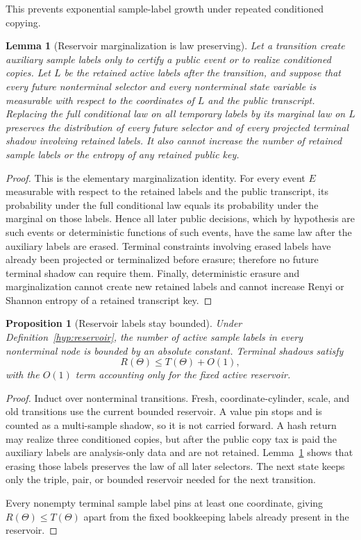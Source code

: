 \documentclass[11pt]{article}
\newtheorem{lemma}[theorem]{Lemma}
\newtheorem{proposition}[theorem]{Proposition}
\begin{document}
This prevents exponential sample-label growth under repeated conditioned
copying.

\begin{lemma}[Reservoir marginalization is law preserving]
\label{lem:reservoir-marginalization}
Let a transition create auxiliary sample labels only to certify a public event
or to realize conditioned copies.  Let $L$ be the retained active labels after
the transition, and suppose that every future nonterminal selector and every
nonterminal state variable is measurable with respect to the coordinates of
$L$ and the public transcript.  Replacing the full conditional law on all
temporary labels by its marginal law on $L$ preserves the distribution of every
future selector and of every projected terminal shadow involving retained
labels.  It also cannot increase the number of retained sample labels or the
entropy of any retained public key.
\end{lemma}

\begin{proof}
This is the elementary marginalization identity.  For every event $E$
measurable with respect to the retained labels and the public transcript, its
probability under the full conditional law equals its probability under the
marginal on those labels.  Hence all later public decisions, which by hypothesis
are such events or deterministic functions of such events, have the same law
after the auxiliary labels are erased.  Terminal constraints involving erased
labels have already been projected or terminalized before erasure; therefore no
future terminal shadow can require them.  Finally, deterministic erasure and
marginalization cannot create new retained labels and cannot increase Renyi or
Shannon entropy of a retained transcript key.
\end{proof}

\begin{proposition}[Reservoir labels stay bounded]
\label{prop:reservoir}
Under Definition~\ref{hyp:reservoir}, the number of active sample labels in
every nonterminal node is bounded by an absolute constant.  Terminal shadows
satisfy
\[
  R(\Theta)\le T(\Theta)+O(1),
\]
with the $O(1)$ term accounting only for the fixed active reservoir.
\end{proposition}

\begin{proof}
Induct over nonterminal transitions.  Fresh, coordinate-cylinder, scale, and
old transitions use the current bounded reservoir.  A value pin stops and is
counted as a
multi-sample shadow, so it is not carried forward.  A hash return may realize
three conditioned copies, but after the public copy tax is paid the auxiliary
labels are analysis-only data and are not retained.  Lemma~\ref{lem:reservoir-marginalization}
shows that erasing those labels preserves the law of all later selectors.  The
next state keeps only the triple, pair, or bounded reservoir needed for the next
transition.

Every nonempty terminal sample label pins at least one coordinate, giving
$R(\Theta)\le T(\Theta)$ apart from the fixed bookkeeping labels already
present in the reservoir.
\end{proof}
\end{document}
